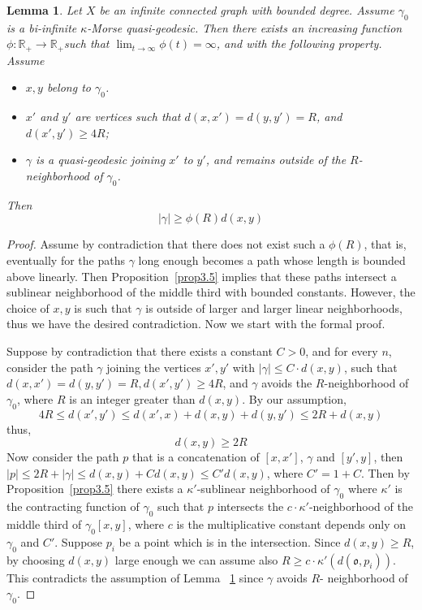 \documentclass[12 pt]{amsart}
\newtheorem{lemma}[theorem]{Lemma}
\theoremstyle{definition}
\theoremstyle{remark}
\begin{document}
\begin{lemma} \label{lemma36}   
Let $X$ be an infinite connected graph with bounded degree. Assume $\gamma_{0}$ is a bi-infinite $\kappa$-Morse quasi-geodesic. Then there exists an increasing function $\phi: \mathbb{R}_{+} \rightarrow \mathbb{R}_{+}$such that $\lim _{t \rightarrow \infty} \phi(t)=\infty$, and with the following property. Assume

\begin{itemize}
  \item $x, y$ belong to $\gamma_{0}$.
  \item $x'$ and $y'$ are vertices such that $d\left(x, x'\right)=d\left(y, y'\right)=R$, and $d\left(x', y'\right) \geq 4 R$;
  \item $\gamma$ is a quasi-geodesic joining $x'$ to $y'$, and remains outside of the $R$-neighborhood of $\gamma_{0}$.
\end{itemize}
Then
\[|\gamma| \geq \phi(R) d(x, y)\]
\end{lemma}

\begin{proof} Assume by contradiction that there does not exist such a $\phi(R)$, that is, eventually for the paths $\gamma$ long enough becomes a path whose length is bounded above linearly. Then Proposition~\ref{prop3.5} implies that these paths intersect a sublinear neighborhood of the middle third with bounded constants. However, the choice of $x, y$ is such that $\gamma$ is outside of larger and larger linear neighborhoods, thus we have the desired contradiction. Now we start with the formal proof.

Suppose by contradiction that there exists a constant $C>0$, and for every $n$, consider the path $\gamma$ joining the vertices $x',y'$ with $|\gamma| \leq C\cdot d(x,y)$,  such that $d\left(x, x'\right)=d\left(y, y'\right)=R, d\left(x', y'\right) \geq 4 R$, and $\gamma$ avoids the $R$-neighborhood of $\gamma_{0}$, where $R$ is an integer greater than $d(x,y)$. By our assumption, \[4R \leq d(x',y') \leq d(x',x)+d(x,y)+d(y,y')\leq 2R + d(x,y)\]  thus, \[d(x,y) \geq 2R\] Now consider the path $p$ that is a concatenation of  $[x,x']$, $\gamma$ and $[y',y]$, then $|p| \leq 2R+ |\gamma| \leq d(x,y) + C d(x,y) \leq C'd(x,y)$, where $C'=1+C$. Then by Proposition~\ref{prop3.5} there exists a $\kappa'$-sublinear neighborhood of $\gamma_0$ where $\kappa'$ is the contracting function of $\gamma_0$ such that $p$ intersects the $c \cdot \kappa'$-neighborhood of the middle third of $\gamma_0[x,y]$, where $c$ is the multiplicative constant depends only on $\gamma_0$ and $C'.$ Suppose $p_i$ be a point which is in the intersection. Since $d(x,y)\geq R$, by choosing $d(x,y)$ large enough we can assume also $R\geq c \cdot \kappa'(d(\mathfrak{o},p_i))$. This contradicts the assumption of Lemma ~\ref{lemma36} since $\gamma$ avoids $R$- neighborhood of $\gamma_0$. 
\end{proof}
\end{document}
